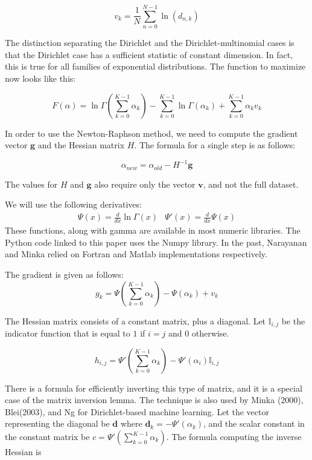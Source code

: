 \documentclass[twoside]{article}
\begin{document}
\[v_k=\frac{1}{N}\sum_{n=0}^{N-1}\ln\left(d_{n,k}\right)\]

The distinction separating the Dirichlet and the Dirichlet-multinomial cases is that the Dirichlet case has a sufficient statistic of constant dimension.  In fact, this is true for all families of exponential distributions\cite[pg 116]{robert}.  The function to maximize now looks like this:

\[
F(\alpha)=\ln\Gamma\left(\sum_{k=0}^{K-1}\alpha_k\right)-\sum_{k=0}^{K-1}\ln\Gamma\left(\alpha_k\right)+\sum_{k=0}^{K-1}\alpha_kv_k
\]

In order to use the Newton-Raphson method, we need to compute the gradient vector $\mathbf{g}$ and the Hessian matrix $H$.  The formula for a single step is as follows:

\[\alpha_{new}=\alpha_{old}-H^{-1}\mathbf{g}\]

The values for $H$ and $\mathbf{g}$ also require only the vector $\mathbf{v}$, and not the full dataset.

We will use the following derivatives:
\[
\begin{array}{cc} \Psi(x) = \frac{d}{dx} \ln\Gamma(x) & \Psi'(x) = \frac{d}{dx} \Psi(x)
\end{array}
\]
These functions, along with gamma are available in most numeric libraries.  The Python code linked to this paper uses the Numpy library.  In the past, Narayanan\cite{narayanan} and Minka\cite{minka} relied on Fortran and Matlab implementations respectively.

The gradient is given as follows:
\[
g_k=\Psi\left(\sum_{k=0}^{K-1}\alpha_k\right)-\Psi(\alpha_k)+v_k
\]

The Hessian matrix consists of a constant matrix, plus a diagonal.  Let $\mathbb{I}_{i,j}$ be the indicator function that is equal to $1$ if $i = j$ and $0$ otherwise.

\[
h_{i,j}=\Psi'\left(\sum_{k=0}^{K-1}\alpha_k\right)-\Psi'(\alpha_i)\mathbb{I}_{i,j}
\]

There is a formula for efficiently inverting this type of matrix, and it is a special case of the matrix inversion lemma\cite{woodbury}.  The technique is also used by Minka\cite{minka} (2000), Blei\cite[A.2]{blei}(2003), and Ng\cite[214]{ng} for Dirichlet-based machine learning. Let the vector representing the diagonal be $\mathbf{d}$ where $\mathbf{d}_k = -\Psi'(\alpha_k)$, and the scalar constant in the constant matrix be $c = \Psi'\left(\sum_{k=0}^{K-1}\alpha_k\right)$.  The formula computing the inverse Hessian is
\end{document}
